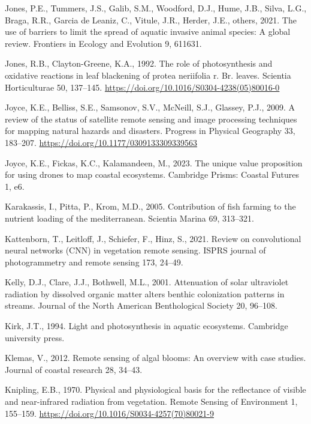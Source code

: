 \documentclass[
  letterpaper,
  11pt,
  english,
  singlespacing,
  headsepline]{MastersDoctoralThesis}
\newlength{\cslhangindent}
\newenvironment{CSLReferences}[2] %
 {\begin{list}{}{%
  \setlength{\itemindent}{0pt}
  \setlength{\leftmargin}{0pt}
  \setlength{\parsep}{0pt}
  \ifodd #1
   \setlength{\leftmargin}{\cslhangindent}
   \setlength{\itemindent}{-1\cslhangindent}
  \fi
  \setlength{\itemsep}{#2\baselineskip}}}
 {\end{list}}
\begin{document}
\begin{CSLReferences}{1}{0}
Jones, P.E., Tummers, J.S., Galib, S.M., Woodford, D.J., Hume, J.B.,
Silva, L.G., Braga, R.R., Garcia de Leaniz, C., Vitule, J.R., Herder,
J.E., others, 2021. The use of barriers to limit the spread of aquatic
invasive animal species: A global review. Frontiers in Ecology and
Evolution 9, 611631.

Jones, R.B., Clayton-Greene, K.A., 1992. The role of photosynthesis and
oxidative reactions in leaf blackening of protea neriifolia r. Br.
leaves. Scientia Horticulturae 50, 137--145.
\url{https://doi.org/10.1016/S0304-4238(05)80016-0}

Joyce, K.E., Belliss, S.E., Samsonov, S.V., McNeill, S.J., Glassey,
P.J., 2009. {A review of the status of satellite remote sensing and
image processing techniques for mapping natural hazards and disasters}.
Progress in Physical Geography 33, 183--207.
\url{https://doi.org/10.1177/0309133309339563}

Joyce, K.E., Fickas, K.C., Kalamandeen, M., 2023. The unique value
proposition for using drones to map coastal ecosystems. Cambridge
Prisms: Coastal Futures 1, e6.

Karakassis, I., Pitta, P., Krom, M.D., 2005. Contribution of fish
farming to the nutrient loading of the mediterranean. Scientia Marina
69, 313--321.

Kattenborn, T., Leitloff, J., Schiefer, F., Hinz, S., 2021. Review on
convolutional neural networks (CNN) in vegetation remote sensing. ISPRS
journal of photogrammetry and remote sensing 173, 24--49.

Kelly, D.J., Clare, J.J., Bothwell, M.L., 2001. Attenuation of solar
ultraviolet radiation by dissolved organic matter alters benthic
colonization patterns in streams. Journal of the North American
Benthological Society 20, 96--108.

Kirk, J.T., 1994. Light and photosynthesis in aquatic ecosystems.
Cambridge university press.

Klemas, V., 2012. Remote sensing of algal blooms: An overview with case
studies. Journal of coastal research 28, 34--43.

Knipling, E.B., 1970. Physical and physiological basis for the
reflectance of visible and near-infrared radiation from vegetation.
Remote Sensing of Environment 1, 155--159.
\url{https://doi.org/10.1016/S0034-4257(70)80021-9}


\end{CSLReferences}
\end{document}
